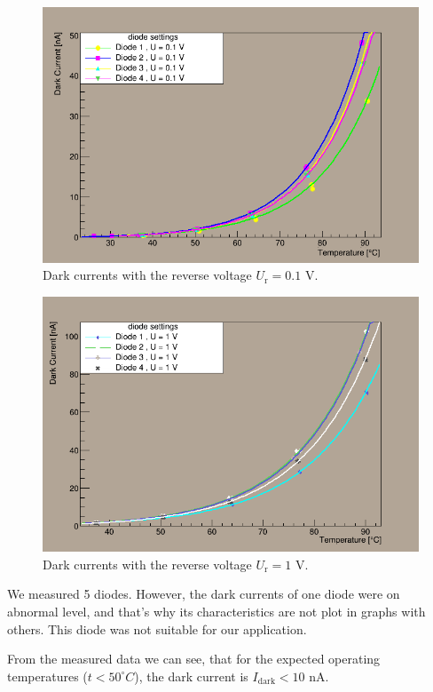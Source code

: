 \begin{figure}[H]
 \centering
 \includegraphics[scale=0.8]{./pictures/01V}
 \caption{Dark currents with the reverse voltage $U_\textrm{r}= 0.1$ V.}
 \label{01V}
\end{figure}

\begin{figure}[H]
 \centering
 \includegraphics[scale=0.8]{./pictures/1V}
 \caption{Dark currents with the reverse voltage $U_\textrm{r}= 1$ V.}
 \label{1V}
\end{figure}


We measured 5 diodes. However, the dark currents of one diode were on abnormal level, and that's why its characteristics are not plot in graphs with others. This diode was not suitable for our application.
\par

From the measured data we can see, that for the expected operating temperatures ($t < 50^{\circ}C$), the dark current is $I_\textrm{dark} < 10$ nA. 

